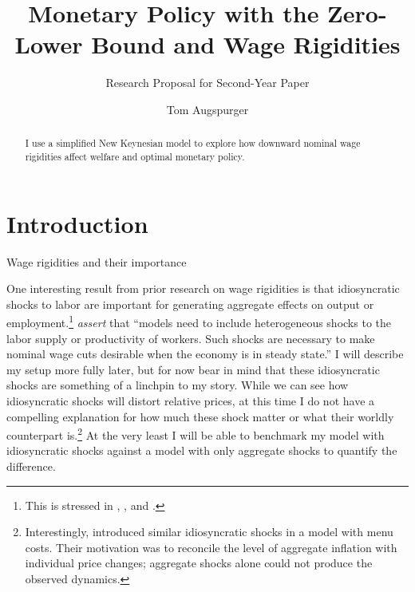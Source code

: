 \documentclass[12pt,a4paper]{scrartcl}            %
\begin{document}
\makeatletter
\def\blfootnote{\xdef\@thefnmark{}\@footnotetext}
\makeatother



\title{Monetary Policy with the Zero-Lower Bound and Wage Rigidities}
\subtitle{Research Proposal for Second-Year Paper}
\author{Tom Augspurger}                               %


\begin{abstract}
I use a simplified New Keynesian model to explore how downward nominal wage rigidities affect welfare and optimal monetary policy.

\end{abstract}

\section{Introduction}
\label{sec:introduction}

Wage rigidities and their importance

One interesting result from prior research on wage rigidities is that idiosyncratic shocks to labor are important for generating aggregate effects on output or employment.\footnote{
This is stressed in \cite{elsby_2009}, \cite{benigno_ricci_2011}, and \cite{daly_hobijn_2013}.}
\cite{daly_hobijn_2013} \emph{assert} that ``models need to include heterogeneous shocks to the labor supply or productivity of workers. Such shocks are necessary to make nominal wage cuts desirable when the economy is in steady state.''
I will describe my setup more fully later, but for now bear in mind that these idiosyncratic shocks are something of a linchpin to my story.
While we can see how idiosyncratic shocks will distort relative prices, at this time I do not have a compelling explanation for how much these shock matter or what their worldly counterpart is.\footnote{
Interestingly, \cite{golosov_lucas_2007} introduced similar idiosyncratic shocks in a model with menu costs.
Their motivation was to reconcile the level of aggregate inflation with individual price changes;
aggregate shocks alone could not produce the observed dynamics.
}
At the very least I will be able to benchmark my model with idiosyncratic shocks against a model with only aggregate shocks to quantify the difference.
\end{document}
